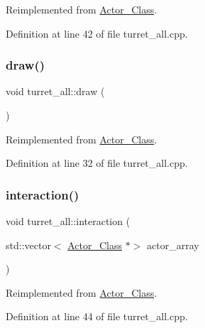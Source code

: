 Reimplemented from \hyperlink{class_actor___class_a9447c6154a674d7e6bdf24ff2874b7a8}{Actor\+\_\+\+Class}.



Definition at line 42 of file turret\+\_\+all.\+cpp.

\hypertarget{classturret__all_ab13a06bdbc2244a7a4460ffc8671f2bd}{}\label{classturret__all_ab13a06bdbc2244a7a4460ffc8671f2bd} 
\subsubsection{\texorpdfstring{draw()}{draw()}}
{\footnotesize\ttfamily void turret\+\_\+all\+::draw (\begin{DoxyParamCaption}{ }\end{DoxyParamCaption})\hspace{0.3cm}{\ttfamily [virtual]}}



Reimplemented from \hyperlink{class_actor___class_ac49cd62be76b4b950ecbe155413f1b64}{Actor\+\_\+\+Class}.



Definition at line 32 of file turret\+\_\+all.\+cpp.

\hypertarget{classturret__all_a6491dcec10ab94ccf35bb371d014e17f}{}\label{classturret__all_a6491dcec10ab94ccf35bb371d014e17f} 
\subsubsection{\texorpdfstring{interaction()}{interaction()}}
{\footnotesize\ttfamily void turret\+\_\+all\+::interaction (\begin{DoxyParamCaption}\item[{std\+::vector$<$ \hyperlink{class_actor___class}{Actor\+\_\+\+Class} $\ast$$>$}]{actor\+\_\+array }\end{DoxyParamCaption})\hspace{0.3cm}{\ttfamily [virtual]}}



Reimplemented from \hyperlink{class_actor___class_a87d1e079d8576fa99592a60b38a04a1b}{Actor\+\_\+\+Class}.



Definition at line 44 of file turret\+\_\+all.\+cpp.

